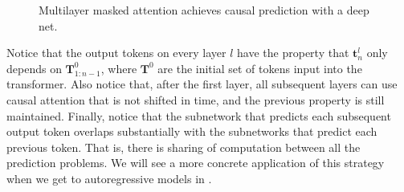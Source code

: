 \begin{figure}[h]
{\begin{minipage}{.49\linewidth}
\end{minipage}
}
\caption{Multilayer masked attention achieves causal prediction with a deep net.}
\label{fig:transformers:multilayer_masked_attention}
\end{figure}

Notice that the output tokens on every layer $l$ have the property that $\mathbf{t}^l_n$ only depends on $\mathbf{T}^0_{1:n-1}$, where $\mathbf{T}^0$ are the initial set of tokens input into the transformer. Also notice that, after the first layer, all subsequent layers can use causal attention that is not shifted in time, and the previous property is still maintained. 
Finally, notice that the subnetwork that predicts each subsequent output token overlaps substantially with the subnetworks that predict each previous token. That is, there is sharing of computation between all the prediction problems. We will see a more concrete application of this strategy when we get to autoregressive models in \sect{\ref{sec:generative_models:autoregressive}}.

